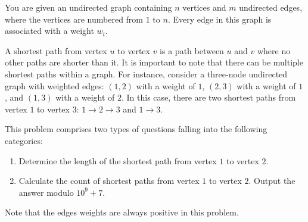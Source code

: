 You are given an undirected graph containing $n$ vertices and $m$ undirected edges, where the vertices are numbered from $1$ to $n$. Every edge in this graph is associated with a weight $w_i$.

A shortest path from vertex $u$ to vertex $v$ is a path between $u$ and $v$ where no other paths are shorter than it.
It is important to note that there can be multiple shortest paths within a graph.
For instance, consider a three-node undirected graph with weighted edges: $(1, 2)$ with a weight of $1$, $(2, 3)$ with a weight of $1$, and $(1, 3)$ with a weight of $2$.
In this case, there are two shortest paths from vertex $1$ to vertex $3$: $1 \to 2 \to 3$ and $1 \to 3$.

This problem comprises two types of questions falling into the following categories:

\begin{enumerate}
    \item Determine the length of the shortest path from vertex $1$ to vertex $2$.
    \item Calculate the count of shortest paths from vertex $1$ to vertex $2$.
    Output the answer modulo $10^9 + 7$.
\end{enumerate}

Note that the edges weights are always positive in this problem.